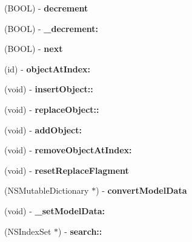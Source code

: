 \begin{DoxyCompactItemize}
\item 
\hypertarget{interface_model_base_a9e5204bb5644b4fb986cf422f2761e1f}{}(B\+O\+O\+L) -\/ {\bfseries decrement}\label{interface_model_base_a9e5204bb5644b4fb986cf422f2761e1f}

\item 
\hypertarget{interface_model_base_af24649b9cd8c07beaaa710f690236230}{}(B\+O\+O\+L) -\/ {\bfseries \+\_\+decrement\+:}\label{interface_model_base_af24649b9cd8c07beaaa710f690236230}

\item 
\hypertarget{interface_model_base_af39e0cabbaeaf68710bcb39d37785457}{}(B\+O\+O\+L) -\/ {\bfseries next}\label{interface_model_base_af39e0cabbaeaf68710bcb39d37785457}

\item 
\hypertarget{interface_model_base_ae051f9e9c9fb1db081aa6c40516d84d8}{}(id) -\/ {\bfseries object\+At\+Index\+:}\label{interface_model_base_ae051f9e9c9fb1db081aa6c40516d84d8}

\item 
\hypertarget{interface_model_base_af869f9f1f531b43a7868a16df4f5acd9}{}(void) -\/ {\bfseries insert\+Object\+::}\label{interface_model_base_af869f9f1f531b43a7868a16df4f5acd9}

\item 
\hypertarget{interface_model_base_a4a6ff4dc3acb6ba378283b8defbaf9f1}{}(void) -\/ {\bfseries replace\+Object\+::}\label{interface_model_base_a4a6ff4dc3acb6ba378283b8defbaf9f1}

\item 
\hypertarget{interface_model_base_a7863bfe035a4b7ddf265efd92623c3b1}{}(void) -\/ {\bfseries add\+Object\+:}\label{interface_model_base_a7863bfe035a4b7ddf265efd92623c3b1}

\item 
\hypertarget{interface_model_base_a66ed5376520a199886155d665cf5f5fc}{}(void) -\/ {\bfseries remove\+Object\+At\+Index\+:}\label{interface_model_base_a66ed5376520a199886155d665cf5f5fc}

\item 
\hypertarget{interface_model_base_ac03e43978b5f06699181890dce5fb003}{}(void) -\/ {\bfseries reset\+Replace\+Flagment}\label{interface_model_base_ac03e43978b5f06699181890dce5fb003}

\item 
\hypertarget{interface_model_base_a09d650dcc58e0f81bd2cf13360d4fed6}{}(N\+S\+Mutable\+Dictionary $\ast$) -\/ {\bfseries convert\+Model\+Data}\label{interface_model_base_a09d650dcc58e0f81bd2cf13360d4fed6}

\item 
\hypertarget{interface_model_base_a86dea9dc8f31a609a6b08bcbf2a0437f}{}(void) -\/ {\bfseries \+\_\+set\+Model\+Data\+:}\label{interface_model_base_a86dea9dc8f31a609a6b08bcbf2a0437f}

\item 
\hypertarget{interface_model_base_a370fc9cc1f288d4be6cba1198c7ec07d}{}(N\+S\+Index\+Set $\ast$) -\/ {\bfseries search\+::}\label{interface_model_base_a370fc9cc1f288d4be6cba1198c7ec07d}

\end{DoxyCompactItemize}
